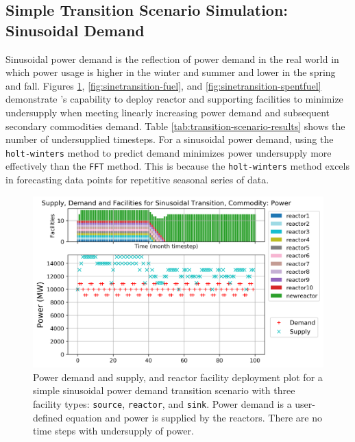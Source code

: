     \subsection{Simple Transition Scenario Simulation: Sinusoidal Demand}
    Sinusoidal power demand is the reflection of power demand in 
    the real world in which power usage is higher in the winter and summer
    and lower in the spring and fall. 
    Figures \ref{fig:sinetransition-power}, \ref{fig:sinetransition-fuel},
    and \ref{fig:sinetransition-spentfuel} demonstrate \deploy's capability 
    to deploy reactor and supporting facilities to minimize undersupply 
    when meeting linearly increasing power demand and subsequent secondary 
    commodities demand. 
    Table \ref{tab:transition-scenario-results} shows the number of 
    undersupplied timesteps.
    For a sinusoidal power demand, using the 
    \texttt{holt-winters} method to predict demand minimizes 
    power undersupply more effectively than the \texttt{FFT} method. 
    This is because the \texttt{holt-winters} method excels in
    forecasting data points for repetitive seasonal series of data. 

    \begin{figure}[]
        \centering
        \includegraphics[width=0.9\linewidth]{figures/sinetransition-power.png} 
            \caption{Power demand and supply, and reactor facility deployment plot for  
            a simple sinusoidal power demand transition scenario with 
            three facility types: \texttt{source}, \texttt{reactor}, and \texttt{sink}.
            Power demand is a user-defined equation and power is supplied by the reactors.
            There are no time steps with undersupply of power.}
            \label{fig:sinetransition-power}
    \end{figure}
    
